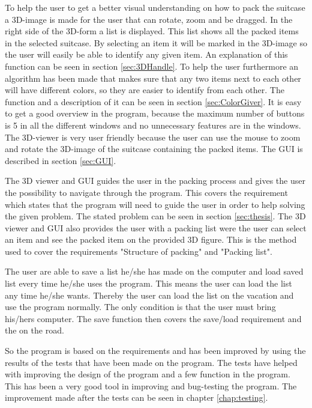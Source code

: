 To help the user to get a better visual understanding on how to pack the suitcase a 3D-image is made for the user that can rotate, zoom and be dragged. In the right side of the 3D-form a list is displayed. This list shows all the packed items in the selected suitcase. By selecting an item it will be marked in the 3D-image so the user will easily be able to identify any given item. An explanation of this function can be seen in section \ref{sec:3DHandle}. To help the user furthermore an algorithm has been made that makes sure that any two items next to each other will have different colors, so they are easier to identify from each other. The function and a description of it can be seen in section \ref{sec:ColorGiver}.
It is easy to get a good overview in the program, because the maximum number of buttons is 5 in all the different windows and no unnecessary features are in the windows. The 3D-viewer is very user friendly because the user can use the mouse to zoom and rotate the 3D-image of the suitcase containing the packed items. The GUI is described in section \ref{sec:GUI}.

The 3D viewer and GUI guides the user in the packing process and gives the user the possibility to navigate through the program. This covers the requirement which states that the program will need to guide the user in order to help solving the given problem. The stated problem can be seen in section \ref{sec:thesis}. The 3D viewer and GUI also provides the user with a packing list were the user can select an item and see the packed item on the provided 3D figure. This is the method used to cover the requirements "Structure of packing" and "Packing list".

The user are able to save a list he/she has made on the computer and load saved list every time he/she uses the program. This means the user can load the list any time he/she wants. Thereby the user can load the list on the vacation and use the program normally. The only condition is that the user must bring his/hers computer. The save function then covers the save/load requirement and the on the road.

So the program is based on the requirements and has been improved by using the results of the tests that have been made on the program. The tests have helped with improving the design of the program and a few function in the program. This has been a very good tool in improving and bug-testing the program. The improvement made after the tests can be seen in chapter \ref{chap:testing}.

